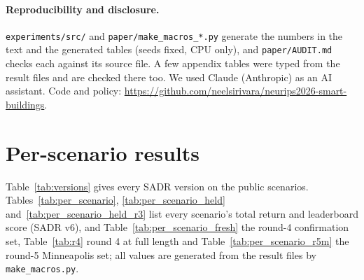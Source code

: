 \documentclass{article}
\begin{document}
\paragraph{Reproducibility and disclosure.} \texttt{experiments/src/} and \texttt{paper/make\_macros\_*.py} generate the numbers in the text and the generated tables (seeds fixed, CPU only), and \texttt{paper/AUDIT.md} checks each against its source file. A few appendix tables were typed from the result files and are checked there too. We used Claude (Anthropic) as an AI assistant. Code and policy: \url{https://github.com/neelsirivara/neurips2026-smart-buildings}.



\clearpage
\appendix
\section{Per-scenario results}
\label{app:per_scenario}

Table~\ref{tab:versions} gives every SADR version on the public scenarios. Tables~\ref{tab:per_scenario}, \ref{tab:per_scenario_held} and~\ref{tab:per_scenario_held_r3}
list every scenario's total return and leaderboard score (SADR v6), and
Table~\ref{tab:per_scenario_fresh} the round-4 confirmation set, Table~\ref{tab:r4} round 4 at full length and
Table~\ref{tab:per_scenario_r5m} the round-5 Minneapolis set; all values are generated from the
result files by \texttt{make\_macros.py}.
\end{document}
